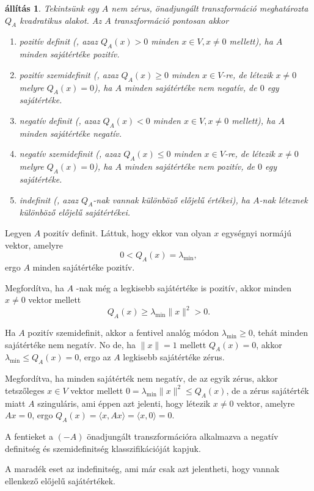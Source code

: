\documentclass[a4paper, showtrims]{memoir}
\makeatletter
\renewenvironment{proof}[1][\proofname]
    {\par\pushQED{\qed}%
    \normalfont \topsep6\p@\@plus6\p@\relax
    \trivlist
    \item[\hskip\labelsep
        \itshape
    #1\@addpunct{:}]\ignorespaces}
    {\popQED\endtrivlist\@endpefalse}
\theoremstyle{plain}
\newtheorem{proposition}{állítás}[chapter]
\theoremstyle{remark}
\theoremstyle{definition}
\newcommand{\ip}[2]{\langle#1,#2\rangle}
\makeatother
\begin{document}
\begin{proposition}
    Tekintsünk egy $A$ nem zérus, önadjungált transzformáció meghatározta $Q_A$ kvadratikus alakot.
    Az $A$ transzformáció pontosan akkor
    \begin{enumerate}
        \item pozitív definit (, azaz $Q_A\left( x \right)>0$ minden $x\in V,x \neq 0$ mellett),
            ha $A$ minden sajátértéke pozitív.
        \item pozitív szemidefinit (, azaz $Q_A\left( x \right)\geq 0$ minden $x\in V$-re, 
            de létezik $x\neq 0$ melyre $Q_A\left( x \right)=0$),
            ha $A$ minden sajátértéke nem negatív, de $0$ egy sajátértéke.
        \item negatív definit (, azaz $Q_A\left( x \right)<0$ minden $x\in V,x \neq 0$ mellett),
            ha $A$ minden sajátértéke negatív.
        \item negatív szemidefinit (, azaz $Q_A\left( x \right)\leq 0$ minden $x\in V$-re, 
            de létezik $x\neq 0$ melyre $Q_A\left( x \right)=0$),
            ha $A$ minden sajátértéke nem pozitív, de $0$ egy sajátértéke.
        \item indefinit (, azaz $Q_A$-nak vannak különböző előjelű értékei),
            ha $A$-nak léteznek különböző előjelű sajátértékei.\qedhere
    \end{enumerate}
\end{proposition}
\begin{proof}
    Legyen $A$ pozitív definit.
    Láttuk, hogy ekkor van olyan $x$ egységnyi normájú vektor, amelyre
    \[
        0<
        Q_A\left( x \right)
        =
        \lambda_{\min},
    \]
    ergo $A$ minden sajátértéke pozitív.
    
    Megfordítva, ha $A$ -nak még a legkisebb sajátértéke is pozitív, akkor minden $x\neq 0$ vektor mellett
    \[
        Q_A\left( x \right)
        \geq
        \lambda_{\min}\|x\|^2
        >
        0.
    \]

    Ha $A$ pozitív szemidefinit, akkor a fentivel analóg módon $\lambda_{\min}\geq 0$,
    tehát minden sajátértéke nem negatív. 
    No de, ha $\|x\|=1$ mellett $Q_A(x)=0$, akkor $\lambda_{\min}\leq Q_A\left( x \right)=0$,
    ergo az $A$ legkisebb sajátértéke zérus.

    Megfordítva, ha minden sajátérték nem negatív, de az egyik zérus, 
    akkor tetszőleges $x\in V$ vektor mellett 
    $0=\lambda_{\min}\|x\|^2\leq Q_A\left( x \right)$, 
    de a zérus sajátérték miatt $A$ szinguláris, ami éppen azt jelenti, hogy létezik $x\neq 0$ vektor,
    amelyre $Ax=0$, ergo $Q_A\left( x \right)=\ip{x}{Ax}=\ip{x}{0}=0$.

    A fentieket a $(-A)$ önadjungált transzformációra alkalmazva a negatív definitség és szemidefinitség klasszifikációját kapjuk. 

    A maradék eset az indefinitség, ami már csak azt jelentheti, hogy vannak ellenkező előjelű sajátértékek.
\end{proof}
\end{document}
